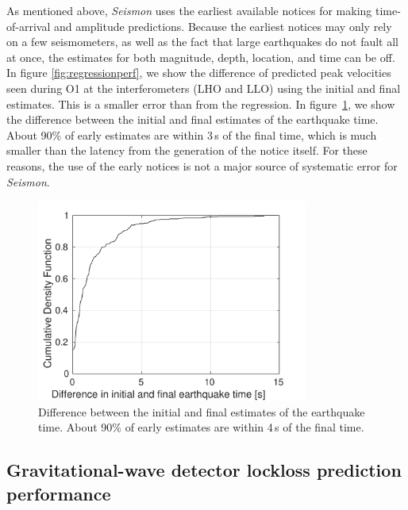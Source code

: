 \documentclass[twocolumn, aps, superscriptaddress]{revtex4}
\begin{document}
As mentioned above, \emph{Seismon} uses the earliest available notices for making time-of-arrival and amplitude predictions. Because the earliest notices may only rely on a few seismometers, as well as the fact that large earthquakes do not fault all at once, the estimates for both magnitude, depth, location, and time can be off. In figure \ref{fig:regressionperf}, we show the difference of predicted peak velocities seen during O1 at the interferometers (LHO and LLO) using the initial and final estimates. This is a smaller error than from the regression. 
In figure~\ref{fig:initialvsfinal}, we show the difference between the initial and final estimates of the earthquake time. About 90\% of early estimates are within 3\,s of the final time, which is much smaller than the latency from the generation of the notice itself.
For these reasons, the use of the early notices is not a major source of systematic error for \emph{Seismon}.

\begin{figure}[t]
\hspace*{-0.5cm}
 \includegraphics[width=3.5in]{lockloss_est_timediff.pdf}
 \caption{Difference between the initial and final estimates of the earthquake time. About 90\% of early estimates are within 4\,s of the final time.}
 \label{fig:initialvsfinal}
\end{figure}

\subsection{Gravitational-wave detector lockloss prediction performance}
\end{document}
